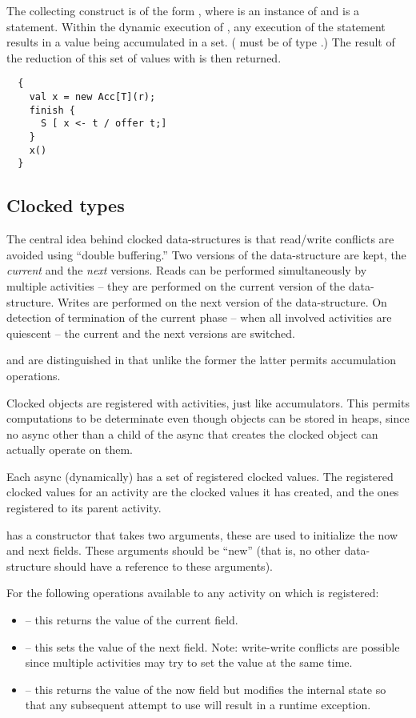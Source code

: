 The collecting  construct is of the form , where  is an instance of  and
 is a statement. Within the dynamic execution of , any
execution of the statement  results in a value 
being accumulated in a set. ( must be of type .) The
result of the reduction of this set of  values with 
is then returned. 

\begin{lstlisting}
  {
    val x = new Acc[T](r);
    finish {
      S [ x <- t / offer t;]
    }
    x()
  }
\end{lstlisting}


\subsection{Clocked types}

The central idea behind clocked data-structures is that read/write
conflicts are avoided using ``double buffering.'' Two versions of the
data-structure are kept, the {\em current} and the {\em next}
versions. Reads can be performed simultaneously by multiple activities
-- they are performed on the current version of the
data-structure. Writes are performed on the next version of the
data-structure. On detection of termination of the current phase --
when all involved activities are quiescent -- the current and the next
versions are switched.

 and  are distinguished in that
unlike the former the latter permits accumulation operations.

Clocked objects are registered with activities, just like
accumulators.  This permits computations to be determinate even though
objects can be stored in heaps, since no async other than a child of
the async that creates the clocked object can actually operate on
them.

Each async (dynamically) has a set of registered clocked values. The
registered clocked values for an activity are the clocked values it
has created, and the ones registered to its parent activity.

  has a constructor that takes two  arguments, these are
used to initialize the now and next fields. These arguments should be
``new'' (that is, no other data-structure should have a reference to
these arguments). 

For  the following operations available to any activity on which 
is registered:
\begin{itemize}
\item {} -- this returns the value of the current field. 
\item {} -- this sets the value of the next field. Note:
     write-write conflicts are possible since multiple activities may
     try to set the value at the same time.
\item{} -- this returns the value of the now field
  but modifies the internal state so that any subsequent attempt to
  use  will result in a runtime exception.
\end{itemize}

